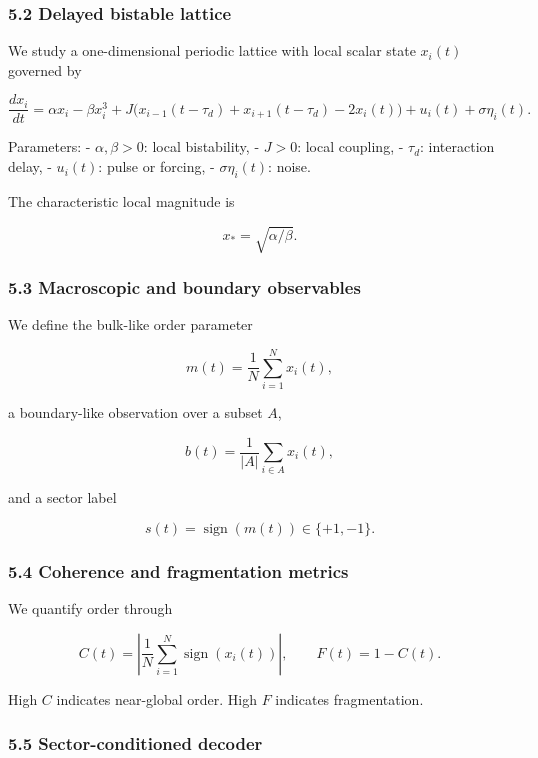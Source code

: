 \documentclass[
]{article}
\begin{document}
\subsubsection{5.2 Delayed bistable
lattice}\label{delayed-bistable-lattice}

We study a one-dimensional periodic lattice with local scalar state
\(x_i(t)\) governed by

\[
\frac{d x_i}{dt} = \alpha x_i - \beta x_i^3 + J\big(x_{i-1}(t-\tau_d) + x_{i+1}(t-\tau_d) - 2x_i(t)\big) + u_i(t) + \sigma \eta_i(t).
\]

Parameters: - \(\alpha,\beta>0\): local bistability, - \(J>0\): local
coupling, - \(\tau_d\): interaction delay, - \(u_i(t)\): pulse or
forcing, - \(\sigma\eta_i(t)\): noise.

The characteristic local magnitude is

\[
x_* = \sqrt{\alpha/\beta}.
\]

\subsubsection{5.3 Macroscopic and boundary
observables}\label{macroscopic-and-boundary-observables}

We define the bulk-like order parameter

\[
m(t)=\frac{1}{N}\sum_{i=1}^N x_i(t),
\]

a boundary-like observation over a subset \(A\),

\[
b(t)=\frac{1}{|A|}\sum_{i\in A} x_i(t),
\]

and a sector label

\[
s(t)=\operatorname{sign}(m(t))\in\{+1,-1\}.
\]

\subsubsection{5.4 Coherence and fragmentation
metrics}\label{coherence-and-fragmentation-metrics}

We quantify order through

\[
C(t)=\left|\frac{1}{N}\sum_{i=1}^N \operatorname{sign}(x_i(t))\right|, \qquad F(t)=1-C(t).
\]

High \(C\) indicates near-global order. High \(F\) indicates
fragmentation.

\subsubsection{5.5 Sector-conditioned
decoder}\label{sector-conditioned-decoder}
\end{document}
